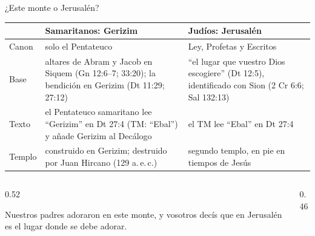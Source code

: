 \begin{frame}{¿Este monte o Jerusalén?}
\scriptsize\renewcommand{\arraystretch}{1.18}
\begin{tabular}{@{}>{\RaggedRight\arraybackslash}p{2.6cm}>{\RaggedRight\arraybackslash}p{4.6cm}>{\RaggedRight\arraybackslash}p{4.6cm}@{}}
\toprule
 & \textbf{Samaritanos: Gerizim} & \textbf{Judíos: Jerusalén} \\ \midrule
Canon & solo el Pentateuco & Ley, Profetas y Escritos \\
Base & altares de Abram y Jacob en Siquem (Gn 12:6--7; 33:20); la bendición en Gerizim (Dt 11:29; 27:12) & ``el lugar que \SENOR{} vuestro Dios escogiere'' (Dt 12:5), identificado con Sion (2 Cr 6:6; Sal 132:13) \\
Texto & el Pentateuco samaritano lee ``Gerizim'' en Dt 27:4 (TM: ``Ebal'') y añade Gerizim al Decálogo & el TM lee ``Ebal'' en Dt 27:4 \\
Templo & construido en Gerizim; destruido por Juan Hircano (129 a.\,e.\,c.) & segundo templo, en pie en tiempos de Jesús \\
\bottomrule
\end{tabular}\par\medskip
\begin{columns}[t,onlytextwidth]
\begin{column}{0.52\textwidth}
\begin{cita}Nuestros padres adoraron en este monte, y vosotros decís que en Jerusalén es el lugar donde se debe adorar.\end{cita}
\end{column}
\begin{column}{0.46\textwidth}
\end{column}
\end{columns}
\end{frame}

